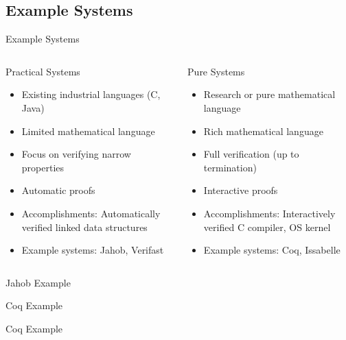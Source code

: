 \documentclass{beamer}
\begin{document}
\subsection{Example Systems}
\begin{frame}{Example Systems}
	\begin{columns}
	\begin{column}[l]{5cm}
		Practical Systems
		\begin{itemize}
			\item Existing industrial languages (C, Java)
			\item Limited mathematical language
			\item Focus on verifying narrow properties
			\item Automatic proofs
			\item Accomplishments: Automatically verified linked data structures
			\item Example systems: Jahob, Verifast
		\end{itemize}
	\end{column}
	\begin{column}[r]{5cm}
		Pure Systems
		\begin{itemize}
			\item Research or pure mathematical language
			\item Rich mathematical language
			\item Full verification (up to termination)
			\item Interactive proofs
			\item Accomplishments: Interactively verified C compiler, OS kernel
			\item Example systems: Coq, Issabelle
		\end{itemize}
	\end{column}
	\end{columns}
\end{frame}


\begin{frame}{Jahob Example}
	
\end{frame}


\begin{frame}{Coq Example}
	
	
	
\end{frame}


\begin{frame}{Coq Example}
	
\end{frame}
\end{document}
